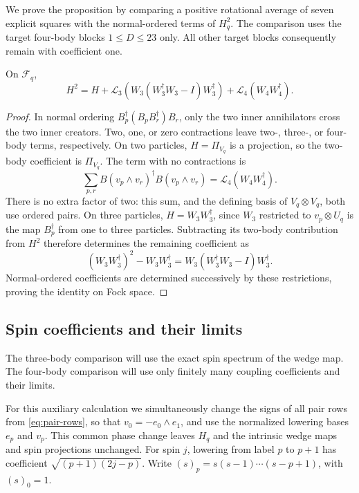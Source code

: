 We prove the proposition by comparing a positive rotational average of
seven explicit squares with the normal-ordered terms of $H_q^2$.
The comparison uses the target four-body blocks $1\le D\le23$ only.
All other target blocks consequently remain with coefficient one.

\begin{lemma}\label{rb:lem:square}
On $\mathcal F_q$,
\begin{equation}\label{rb:eq:square}
 H^2=H+\mathcal L_3\!\left(W_3(W_3^\dagger W_3-I)W_3^\dagger\right)
       +\mathcal L_4(W_4W_4^\dagger).
\end{equation}
\end{lemma}
\begin{proof}
In normal ordering $B_p^\dagger(B_pB_r^\dagger)B_r$, only the two inner annihilators cross the two inner creators. Two, one, or zero contractions leave two-, three-, or four-body terms, respectively. On two particles, $H=\Pi_{V_q}$ is a projection, so the two-body coefficient is $\Pi_{V_q}$. The term with no contractions is
\[
 \sum_{p,r}B(v_p\wedge v_r)^\dagger B(v_p\wedge v_r)
 =\mathcal L_4(W_4W_4^\dagger).
\]
There is no extra factor of two: this sum, and the defining basis of $V_q\otimes V_q$, both use ordered pairs. On three particles, $H=W_3W_3^\dagger$, since $W_3$ restricted to $v_p\otimes U_q$ is the map $B_p^\dagger$ from one to three particles. Subtracting its two-body contribution from $H^2$ therefore determines the remaining coefficient as
\[
 (W_3W_3^\dagger)^2-W_3W_3^\dagger
 =W_3(W_3^\dagger W_3-I)W_3^\dagger.
\]
Normal-ordered coefficients are determined successively by these restrictions, proving the identity on Fock space.
\end{proof}

\subsection{Spin coefficients and their limits}
\label{rb:sec:spin}
The three-body comparison will use the exact spin spectrum of the wedge map. The four-body comparison will use only finitely many coupling coefficients and their limits.

For this auxiliary calculation we simultaneously change the signs of all pair rows from \eqref{eq:pair-rows}, so that $v_0=-e_0\wedge e_1$, and use the normalized lowering bases $e_p$ and $v_p$. This common phase change leaves $H_q$ and the intrinsic wedge maps and spin projections unchanged. For spin $j$, lowering from label $p$ to $p+1$ has coefficient $\sqrt{(p+1)(2j-p)}$. Write $(s)_p=s(s-1)\cdots(s-p+1)$, with $(s)_0=1$.


